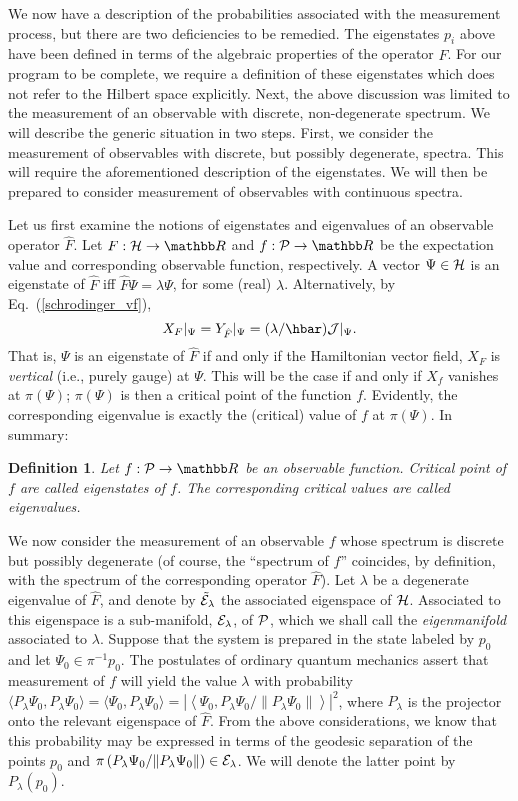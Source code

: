 \documentclass[12pt,aps,eqsecnum,tighten]{revtex4-2}
\newtheorem{definition}{Definition}[section]
\def\be{\begin{equation}}
\def\ee{\end{equation}}
\def\<{\langle}
\def\>{\rangle}
\def\H{{\cal H}}
\def\P{{\cal P}}
\def\J{{\cal J}}
\newcommand{\eqn}[1]{Eq.~(\ref{#1})}
\newcommand{\hvf}[1]{{X_{#1}}}
\def\Bbb{}
\def\R{\mathbb R}
\begin{document}
We now have a description of the probabilities associated with the
measurement process, but there are two deficiencies to be remedied.
The eigenstates $p_i$ above have been defined in terms of the
algebraic properties of the operator $\hat{F}$.  For our program to be
complete, we require a definition of these eigenstates which does not
refer to the Hilbert space explicitly.  Next, the above discussion was
limited to the measurement of an observable with discrete,
non-degenerate spectrum.  We will describe the generic situation in
two steps.  First, we consider the measurement of observables with
discrete, but possibly degenerate, spectra.  This will require the
aforementioned description of the eigenstates.  We will then be
prepared to consider measurement of observables with continuous
spectra.

Let us first examine the notions of eigenstates and eigenvalues of an
observable operator $\hat{F}$. Let $F : \H \rightarrow \R$ and $f :
\P \rightarrow \R$ be the expectation value and corresponding
observable function, respectively.  A vector $\Psi\in\H$ is an
eigenstate of $\hat{F}$ iff $\hat{F}\Psi = \lambda \Psi$, for some
(real) $\lambda$.  Alternatively, by \eqn{schrodinger_vf},
%
\be
\hvf{F}|_\Psi = Y_{\hat{F}}|_\Psi = (\lambda / \hbar) \J|_\Psi.
\ee
%
That is, $\Psi$ is an eigenstate of $\hat{F}$ if and only if the
Hamiltonian vector field, $\hvf{F}$ is {\em vertical} (i.e., purely
gauge) at $\Psi$.  This will be the case if and only if $\hvf{f}$
vanishes at $\pi(\Psi)$;  $\pi(\Psi)$ is then a critical point of the
function $f$.  Evidently, the corresponding eigenvalue is exactly the
(critical) value of $f$ at $\pi(\Psi)$.  In summary:
%
\begin{definition}
Let $f:\P\rightarrow\R$ be an observable function.  Critical point of
$f$ are called {\em eigenstates} of $f$.  The corresponding critical
values are called {\em eigenvalues}.
\end{definition}

We now consider the measurement of an observable $f$ whose spectrum is
discrete but possibly degenerate (of course, the ``spectrum of $f$''
coincides, by definition, with the spectrum of the corresponding
operator $\hat{F}$).  Let $\lambda$ be a degenerate eigenvalue of
$\hat{F}$, and denote by $\tilde{\cal E}_\lambda$ the associated
eigenspace of $\H$.  Associated to this eigenspace is a sub-manifold,
${\cal E}_\lambda$, of $\P$, which we shall call the {\em
eigenmanifold} associated to $\lambda$.  Suppose that the system is
prepared in the state labeled by $p_0$ and let $\Psi_0 \in
\pi^{-1}p_0$.  The postulates of ordinary quantum mechanics assert
that measurement of $f$ will yield the value $\lambda$ with
probability $\< {\Bbb P}_\lambda \Psi_0, {\Bbb P}_\lambda \Psi_0 \> =
\< \Psi_0, {\Bbb P}_\lambda \Psi_0 \> = \left| \left< \Psi_0, {\Bbb
P}_\lambda \Psi_0 / \| {\Bbb P}_\lambda \Psi_0 \| \right> \right|^2$,
where ${\Bbb P}_\lambda$ is the projector onto the relevant eigenspace
of $\hat{F}$. {}From the above considerations, we know that this
probability may be expressed in terms of the geodesic separation of
the points $p_0$ and $\pi\left( {\Bbb P}_\lambda \Psi_0 / \| {\Bbb
P}_\lambda \Psi_0 \|\right) \in {\cal E}_\lambda$.  We will denote the
latter point by ${\Bbb P}_\lambda(p_0)$.
\end{document}

